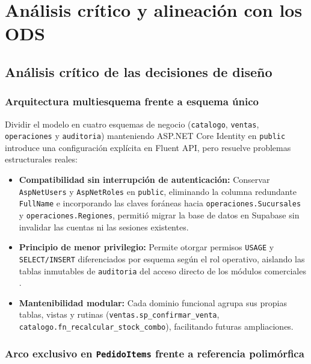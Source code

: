 
\section{An\'alisis cr\'itico y alineaci\'on con los ODS}

\subsection{An\'alisis cr\'itico de las decisiones de dise\~no}

\subsubsection{Arquitectura multiesquema frente a esquema \'unico}

Dividir el modelo en cuatro esquemas de negocio (\texttt{catalogo}, \texttt{ventas}, \texttt{operaciones} y \texttt{auditoria}) manteniendo ASP.NET Core Identity en \texttt{public} introduce una configuraci\'on expl\'icita en Fluent API, pero resuelve problemas estructurales reales:

\begin{itemize}
  \item \textbf{Compatibilidad sin interrupci\'on de autenticaci\'on:} Conservar \texttt{AspNetUsers} y \texttt{AspNetRoles} en \texttt{public}, eliminando la columna redundante \texttt{FullName} e incorporando las claves for\'aneas hacia \texttt{operaciones.Sucursales} y \texttt{operaciones.Regiones}, permiti\'o migrar la base de datos en Supabase sin invalidar las cuentas ni las sesiones existentes.
  \item \textbf{Principio de menor privilegio:} Permite otorgar permisos \texttt{USAGE} y \texttt{SELECT/INSERT} diferenciados por esquema seg\'un el rol operativo, aislando las tablas inmutables de \texttt{auditoria} del acceso directo de los m\'odulos comerciales \citep{postgresql2024}.
  \item \textbf{Mantenibilidad modular:} Cada dominio funcional agrupa sus propias tablas, vistas y rutinas (\texttt{ventas.sp\_confirmar\_venta}, \texttt{catalogo.fn\_recalcular\_stock\_combo}), facilitando futuras ampliaciones.
\end{itemize}

\subsubsection{Arco exclusivo en \texttt{PedidoItems} frente a referencia polim\'orfica}

